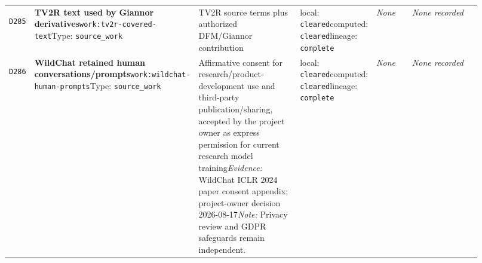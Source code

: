 \documentclass[9pt,a4paper]{article}
\newcommand{\depid}[1]{\hypertarget{dep:#1}{\texttt{#1}}}
\begin{document}
\begin{landscape}
\begin{longtable}{@{}L{0.035\linewidth}L{0.185\linewidth}L{0.27\linewidth}L{0.09\linewidth}L{0.10\linewidth}L{0.24\linewidth}@{}}
\depid{D285} & \textbf{TV2R text used by Giannor derivatives}\newline \nolinkurl{work:tv2r-covered-text}\newline Type: \texttt{source\_work} & TV2R source terms plus authorized DFM/Giannor contribution & local: \texttt{cleared}\newline computed: \texttt{cleared}\newline lineage: \texttt{complete} & \textit{None} & \textit{None recorded} \\
\depid{D286} & \textbf{WildChat retained human conversations/prompts}\newline \nolinkurl{work:wildchat-human-prompts}\newline Type: \texttt{source\_work} & Affirmative consent for research/product-development use and third-party publication/sharing, accepted by the project owner as express permission for current research model training\newline \textit{Evidence:} WildChat ICLR 2024 paper consent appendix; project-owner decision 2026-08-17\newline \textit{Note:} Privacy review and GDPR safeguards remain independent. & local: \texttt{cleared}\newline computed: \texttt{cleared}\newline lineage: \texttt{complete} & \textit{None} & \textit{None recorded} \\
\end{longtable}

\end{landscape}
\end{document}
